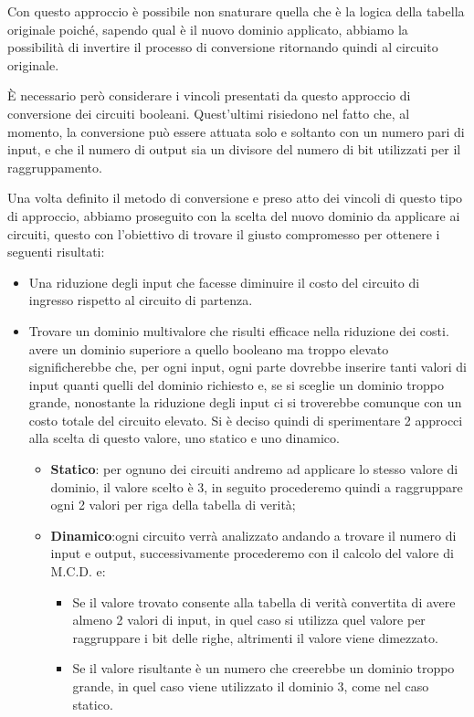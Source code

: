 \documentclass[
  italian,
]{book}
\providecommand{\tightlist}{%
  \setlength{\itemsep}{0pt}\setlength{\parskip}{0pt}}
\begin{document}
Con questo approccio è possibile non snaturare quella che è la logica della tabella originale poiché, sapendo qual è il nuovo dominio applicato, abbiamo la possibilità di invertire il processo di conversione ritornando quindi al circuito originale.

È necessario però considerare i vincoli presentati da questo approccio di conversione dei circuiti booleani. Quest'ultimi risiedono nel fatto che, al momento, la conversione può essere attuata solo e soltanto con un numero pari di input, e che il numero di output sia un divisore del numero di bit utilizzati per il raggruppamento.

\newpage

Una volta definito il metodo di conversione e preso atto dei vincoli di questo tipo di approccio, abbiamo proseguito con la scelta del nuovo dominio da applicare ai circuiti, questo con l'obiettivo di trovare il giusto compromesso per ottenere i seguenti risultati:

\begin{itemize}
\item
  Una riduzione degli input che facesse diminuire il costo del circuito di ingresso rispetto al circuito di partenza.
\item
  Trovare un dominio multivalore che risulti efficace nella riduzione dei costi. avere un dominio superiore a quello booleano ma troppo elevato significherebbe che, per ogni input, ogni parte dovrebbe inserire tanti valori di input quanti quelli del dominio richiesto e, se si sceglie un dominio troppo grande, nonostante la riduzione degli input ci si troverebbe comunque con un costo totale del circuito elevato. Si è deciso quindi di sperimentare 2 approcci alla scelta di questo valore, uno statico e uno dinamico.

  \begin{itemize}
  \tightlist
  \item
    \textbf{Statico}: per ognuno dei circuiti andremo ad applicare lo stesso valore di dominio, il valore scelto è 3, in seguito procederemo quindi a raggruppare ogni 2 valori per riga della tabella di verità;
  \item
    \textbf{Dinamico}:ogni circuito verrà analizzato andando a trovare il numero di input e output, successivamente procederemo con il calcolo del valore di M.C.D. e:

    \begin{itemize}
    \tightlist
    \item
      Se il valore trovato consente alla tabella di verità convertita di avere almeno 2 valori di input, in quel caso si utilizza quel valore per raggruppare i bit delle righe, altrimenti il valore viene dimezzato.
    \item
      Se il valore risultante è un numero che creerebbe un dominio troppo grande, in quel caso viene utilizzato il dominio 3, come nel caso statico.
    \end{itemize}
  \end{itemize}
\end{itemize}
\end{document}
